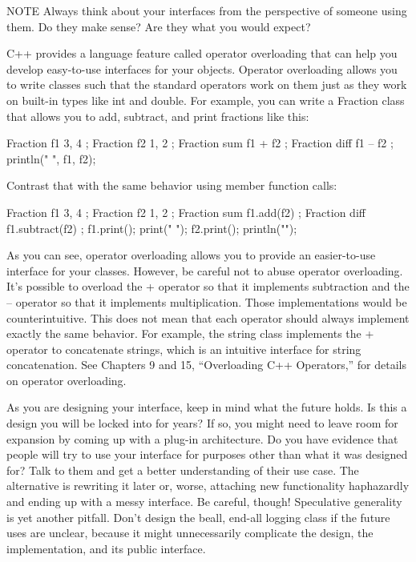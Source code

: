 \begin{myNotic}{NOTE}
Always think about your interfaces from the perspective of someone using them. Do they make sense? Are they what you would expect?
\end{myNotic}

C++ provides a language feature called operator overloading that can help you develop easy-to-use interfaces for your objects. Operator overloading allows you to write classes such that the standard operators work on them just as they work on built-in types like int and double. For example, you can write a Fraction class that allows you to add, subtract, and print fractions like this:

\begin{cpp}
Fraction f1 { 3, 4 };
Fraction f2 { 1, 2 };
Fraction sum { f1 + f2 };
Fraction diff { f1 – f2 };
println("{} {}", f1, f2);
\end{cpp}

Contrast that with the same behavior using member function calls:

\begin{cpp}
Fraction f1 { 3, 4 };
Fraction f2 { 1, 2 };
Fraction sum { f1.add(f2) };
Fraction diff { f1.subtract(f2) };
f1.print();
print(" ");
f2.print();
println("");
\end{cpp}

As you can see, operator overloading allows you to provide an easier-to-use interface for your classes. However, be careful not to abuse operator overloading. It’s possible to overload the + operator so that it implements subtraction and the – operator so that it implements multiplication. Those implementations would be counterintuitive. This does not mean that each operator should always implement exactly the same behavior. For example, the string class implements the + operator to concatenate strings, which is an intuitive interface for string concatenation. See Chapters 9 and 15, “Overloading C++ Operators,” for details on operator overloading.


As you are designing your interface, keep in mind what the future holds. Is this a design you will be locked into for years? If so, you might need to leave room for expansion by coming up with a plug-in architecture. Do you have evidence that people will try to use your interface for purposes other than what it was designed for? Talk to them and get a better understanding of their use case. The alternative is rewriting it later or, worse, attaching new functionality haphazardly and ending up with a messy interface. Be careful, though! Speculative generality is yet another pitfall. Don’t design the beall, end-all logging class if the future uses are unclear, because it might unnecessarily complicate the design, the implementation, and its public interface.

